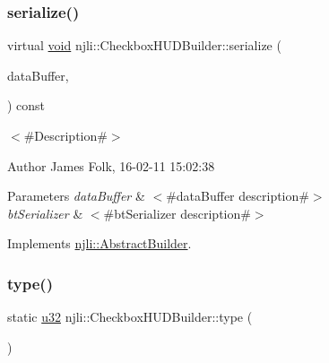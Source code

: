 \subsubsection{\texorpdfstring{serialize()}{serialize()}}
{\footnotesize\ttfamily virtual \mbox{\hyperlink{_thread_8h_af1e856da2e658414cb2456cb6f7ebc66}{void}} njli\+::\+Checkbox\+H\+U\+D\+Builder\+::serialize (\begin{DoxyParamCaption}\item[{\mbox{\hyperlink{_thread_8h_af1e856da2e658414cb2456cb6f7ebc66}{void}} $\ast$}]{data\+Buffer,  }\item[{bt\+Serializer $\ast$}]{ }\end{DoxyParamCaption}) const\hspace{0.3cm}{\ttfamily [virtual]}}



$<$\#\+Description\#$>$ 

\begin{DoxyAuthor}{Author}
James Folk, 16-\/02-\/11 15\+:02\+:38
\end{DoxyAuthor}

\begin{DoxyParams}{Parameters}
{\em data\+Buffer} & $<$\#data\+Buffer description\#$>$ \\
\hline
{\em bt\+Serializer} & $<$\#bt\+Serializer description\#$>$ \\
\hline
\end{DoxyParams}


Implements \mbox{\hyperlink{classnjli_1_1_abstract_builder_ab66b774e02ccb9da554c9aab7fa6d981}{njli\+::\+Abstract\+Builder}}.

\mbox{\label{classnjli_1_1_checkbox_h_u_d_builder_a7cd1bf586fa32ec0679ba022b82118fe}} 
\subsubsection{\texorpdfstring{type()}{type()}}
{\footnotesize\ttfamily static \mbox{\hyperlink{_util_8h_a10e94b422ef0c20dcdec20d31a1f5049}{u32}} njli\+::\+Checkbox\+H\+U\+D\+Builder\+::type (\begin{DoxyParamCaption}{ }\end{DoxyParamCaption})\hspace{0.3cm}{\ttfamily [static]}}

